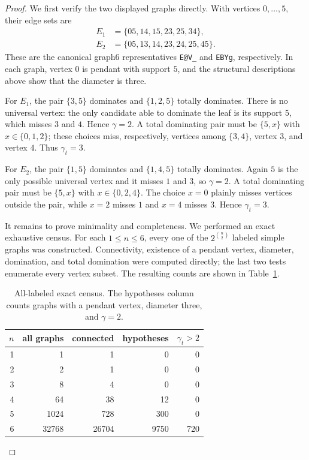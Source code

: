 \documentclass[11pt]{article}
\theoremstyle{remark}
\begin{document}
\begin{proof}
We first verify the two displayed graphs directly.  With vertices
\(0,\ldots,5\), their edge sets are
\begin{align*}
E_1&=\{05,14,15,23,25,34\},\\
E_2&=\{05,13,14,23,24,25,45\}.
\end{align*}
These are the canonical graph6 representatives \texttt{E@V\_} and
\texttt{EBYg}, respectively.  In each graph, vertex \(0\) is pendant with
support \(5\), and the structural descriptions above show that the diameter is
three.

For \(E_1\), the pair \(\{3,5\}\) dominates and \(\{1,2,5\}\) totally
dominates.  There is no universal vertex: the only candidate able to dominate
the leaf is its support \(5\), which misses \(3\) and \(4\).  Hence
\(\gamma=2\).  A total dominating pair must be \(\{5,x\}\) with
\(x\in\{0,1,2\}\); these choices miss, respectively, vertices among
\(\{3,4\}\), vertex \(3\), and vertex \(4\).  Thus \(\gamma_t=3\).

For \(E_2\), the pair \(\{1,5\}\) dominates and \(\{1,4,5\}\) totally
dominates.  Again \(5\) is the only possible universal vertex and it misses
\(1\) and \(3\), so \(\gamma=2\).  A total dominating pair must be
\(\{5,x\}\) with \(x\in\{0,2,4\}\).  The choice \(x=0\) plainly misses
vertices outside the pair, while \(x=2\) misses \(1\) and \(x=4\) misses
\(3\).  Hence \(\gamma_t=3\).

It remains to prove minimality and completeness.  We performed an exact
exhaustive census.  For each \(1\leq n\leq6\), every one of the
\(2^{\binom n2}\) labeled simple graphs was constructed.  Connectivity,
existence of a pendant vertex, diameter, domination, and total domination were
computed directly; the last two tests enumerate every vertex subset.  The
resulting counts are shown in Table~\ref{tab:labeled}.

\begin{table}[ht]
\centering
\caption{All-labeled exact census.  The hypotheses column counts graphs with a
pendant vertex, diameter three, and \(\gamma=2\).}
\label{tab:labeled}
\begin{tabular}{rrrrr}
\toprule
\(n\) & all graphs & connected & hypotheses & \(\gamma_t>2\)\\
\midrule
1 & 1     & 1     & 0    & 0\\
2 & 2     & 1     & 0    & 0\\
3 & 8     & 4     & 0    & 0\\
4 & 64    & 38    & 12   & 0\\
5 & 1024  & 728   & 300  & 0\\
6 & 32768 & 26704 & 9750 & 720\\
\bottomrule
\end{tabular}
\end{table}


\end{proof}
\end{document}
